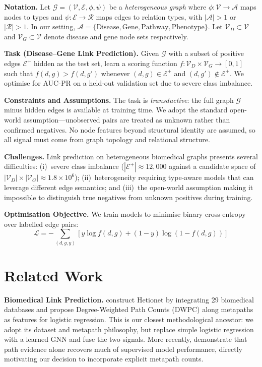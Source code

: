 \documentclass{article}
\newcommand{\Gcal}{\mathcal{G}}
\newcommand{\Vcal}{\mathcal{V}}
\newcommand{\Ecal}{\mathcal{E}}
\newcommand{\Rcal}{\mathcal{R}}
\begin{document}
\textbf{Notation.} Let $\Gcal = (\Vcal, \Ecal, \phi, \psi)$ be a \textit{heterogeneous graph} where $\phi : \Vcal \to \mathcal{A}$ maps nodes to types and $\psi : \Ecal \to \Rcal$ maps edges to relation types, with $|\mathcal{A}| > 1$ or $|\Rcal| > 1$. In our setting, $\mathcal{A} = \{\text{Disease}, \text{Gene}, \text{Pathway}, \text{Phenotype}\}$. Let $\Vcal_D \subset \Vcal$ and $\Vcal_G \subset \Vcal$ denote disease and gene node sets respectively.

\textbf{Task (Disease--Gene Link Prediction).} Given $\Gcal$ with a subset of positive edges $\Ecal^+$ hidden as the test set, learn a scoring function $f : \Vcal_D \times \Vcal_G \to [0,1]$ such that $f(d,g) > f(d,g')$ whenever $(d,g) \in \Ecal^+$ and $(d,g') \notin \Ecal^+$. We optimise for AUC-PR on a held-out validation set due to severe class imbalance.

\textbf{Constraints and Assumptions.} The task is \textit{transductive}: the full graph $\Gcal$ minus hidden edges is available at training time. We adopt the standard open-world assumption---unobserved pairs are treated as unknown rather than confirmed negatives. No node features beyond structural identity are assumed, so all signal must come from graph topology and relational structure.

\textbf{Challenges.} Link prediction on heterogeneous biomedical graphs presents several difficulties: (i)~severe class imbalance ($|\Ecal^+| \approx 12{,}000$ against a candidate space of $|\Vcal_D| \times |\Vcal_G| \approx 1.8 \times 10^6$); (ii)~heterogeneity requiring type-aware models that can leverage different edge semantics; and (iii)~the open-world assumption making it impossible to distinguish true negatives from unknown positives during training.

\textbf{Optimisation Objective.} We train models to minimise binary cross-entropy over labelled edge pairs:
\begin{equation}
\mathcal{L} = -\sum_{(d,g,y)}\left[y\log f(d,g)+(1-y)\log(1-f(d,g))\right]
\label{eq:loss}
\end{equation}

\section{Related Work}
\label{sec:related}

\textbf{Biomedical Link Prediction.} \citet{himmelstein2017} construct Hetionet by integrating 29 biomedical databases and propose Degree-Weighted Path Counts (DWPC) along metapaths as features for logistic regression. This is our closest methodological ancestor: we adopt its dataset and metapath philosophy, but replace simple logistic regression with a learned GNN and fuse the two signals. More recently, \citet{himmelstein2022} demonstrate that path evidence alone recovers much of supervised model performance, directly motivating our decision to incorporate explicit metapath counts.
\end{document}

